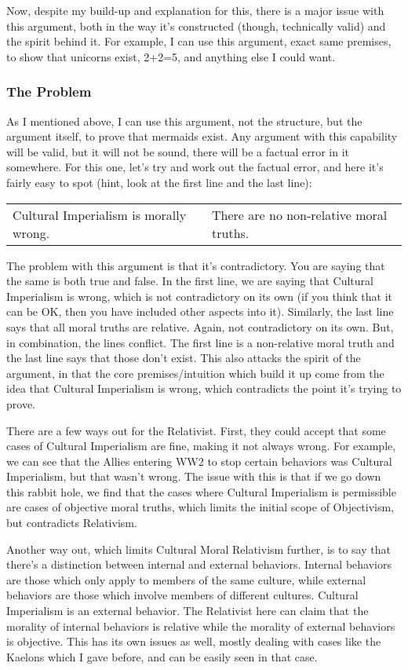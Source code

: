 Now, despite my build-up and explanation for this, there is a major issue with this argument, both in the way it's constructed (though, technically valid) and the spirit behind it. For example, I can use this argument, exact same premises, to show that unicorns exist, 2+2=5, and anything else I could want. 

\subsubsection{The Problem}

As I mentioned above, I can use this argument, not the structure, but the argument itself, to prove that mermaids exist. Any argument with this capability will be valid, but it will not be sound, there will be a factual error in it somewhere. For this one, let's try and work out the factual error, and here it's fairly easy to spot (hint, look at the first line and the last line):
\begin{tabular}{p{2in}|p{2in}}
Cultural Imperialism is morally wrong.&There are no non-relative moral truths.
\end{tabular}
The problem with this argument is that it's contradictory. You are saying that the same is both true and false. In the first line, we are saying that Cultural Imperialism is wrong, which is not contradictory on its own (if you think that it can be OK, then you have included other aspects into it). Similarly, the last line says that all moral truths are relative. Again, not contradictory on its own. But, in combination, the lines conflict. The first line is a non-relative moral truth and the last line says that those don't exist. This also attacks the spirit of the argument, in that the core premises/intuition which build it up come from the idea that Cultural Imperialism is wrong, which contradicts the point it's trying to prove. 

There are a few ways out for the Relativist. First, they could accept that some cases of Cultural Imperialism are fine, making it not always wrong. For example, we can see that the Allies entering WW2 to stop certain behaviors was Cultural Imperialism, but that wasn't wrong. The issue with this is that if we go down this rabbit hole, we find that the cases where Cultural Imperialism is permissible are cases of objective moral truths, which limits the initial scope of Objectivism, but contradicts Relativism. 

Another way out, which limits Cultural Moral Relativism further, is to say that there's a distinction between internal and external behaviors. Internal behaviors are those which only apply to members of the same culture, while external behaviors are those which involve members of different cultures. Cultural Imperialism is an external behavior. The Relativist here can claim that the morality of internal behaviors is relative while the morality of external behaviors is objective. This has its own issues as well, mostly dealing with cases like the Kaelons which I gave before, and can be easily seen in that case. 

